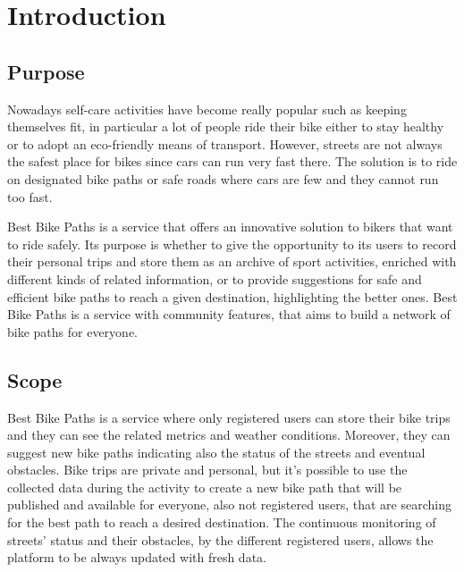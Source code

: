 \documentclass{Configuration_Files/PoliMi3i_thesis}
\begin{document}
\mainmatter %


\chapter{Introduction}
\label{ch:chapter_one}%



\section{Purpose}
Nowadays self-care activities have become really popular such as keeping themselves fit, in particular a lot of people ride their bike either to stay healthy or to adopt an eco-friendly means of transport. However, streets are not always the safest place for bikes since cars can run very fast there. The solution is to ride on designated bike paths or safe roads where cars are few and they cannot run too fast.

Best Bike Paths is a service that offers an innovative solution to bikers that want to ride safely. Its purpose is whether to give the opportunity to its users to record their personal trips and store them as an archive of sport activities, enriched with different kinds of related information, or to provide suggestions for safe and efficient bike paths to reach a given destination, highlighting the better ones. Best Bike Paths is a service with community features, that aims to build a network of bike paths for everyone.

\section{Scope}
Best Bike Paths is a service where only registered users can store their bike trips and they can see the related metrics and weather conditions. Moreover, they can suggest new bike paths indicating also the status of the streets and eventual obstacles. Bike trips are private and personal, but it's possible to use the collected data during the activity to create a new bike path that will be published and available for everyone, also not registered users, that are searching for the best path to reach a desired destination. The continuous monitoring of streets' status and their obstacles, by the different registered users, allows the platform to be always updated with fresh data.
\end{document}
